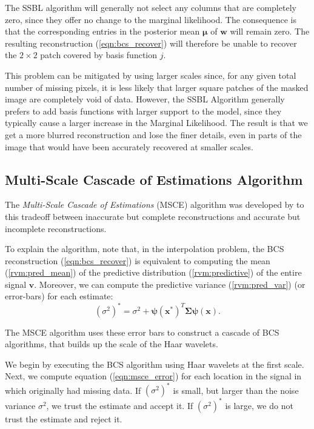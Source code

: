 The SSBL algorithm will generally not select any columns that are completely zero, since they offer no change to the marginal likelihood.
The consequence is that the corresponding entries in the posterior mean $\bm\mu$ of $\bm w$ will remain zero.
The resulting reconstruction (\ref{eqn:bcs_recover}) will therefore be unable to recover the $2\times 2$ patch covered by basis function $j$.

This problem can be mitigated by using larger scales since, for any given total number of missing pixels, it is less likely that larger square patches of the masked image are completely void of data.
However, the SSBL Algorithm generally prefers to add basis functions with larger support to the model, since they typically cause a larger increase in the Marginal Likelihood.
The result is that we get a more blurred reconstruction and lose the finer details, even in parts of the image that would have been accurately recovered at smaller scales.





\subsection{Multi-Scale Cascade of Estimations Algorithm}
The \emph{Multi-Scale Cascade of Estimations} (MSCE) algorithm was developed by \cite{pilikos2014} to this tradeoff between inaccurate but complete reconstructions and accurate but incomplete reconstructions.

To explain the algorithm, note that, in the interpolation problem, the BCS reconstruction (\ref{eqn:bcs_recover}) is equivalent to computing the mean (\ref{rvm:pred_mean}) of the predictive distribution (\ref{rvm:predictive}) of the entire signal $\bm v$.
Moreover, we can compute the predictive variance (\ref{rvm:pred_var}) (or error-bars) for each estimate:
\begin{equation}
\label{eqn:msce_error}
  (\sigma^2)^* = \sigma^2 +\bm\psi(\bm x^*)^T\bm\Sigma\bm\psi(\bm x).
\end{equation}

The MSCE algorithm uses these error bars to construct a cascade of BCS algorithms, that builds up the scale of the Haar wavelets.

We begin by executing the BCS algorithm using Haar wavelets at the first scale.
Next, we compute equation (\ref{eqn:msce_error}) for each location in the signal in which originally had missing data.
If $(\sigma^2)^*$ is small, but larger than the noise variance $\sigma^2$, we trust the estimate and accept it. 
If $(\sigma^2)^*$ is large, we do not trust the estimate and reject it.

